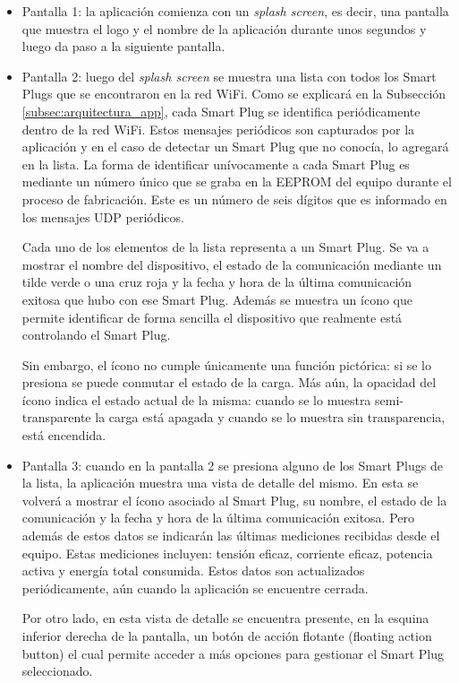 \begin{itemize}
\item  Pantalla 1: la aplicación comienza con un \textit{splash screen}, es decir, una pantalla que muestra el logo y el nombre de la aplicación durante unos segundos y luego da paso a la siguiente pantalla.

\item Pantalla 2: luego del \textit{splash screen} se muestra una lista con todos los Smart Plugs que se encontraron en la red WiFi. Como se explicará en la Subsección \ref{subsec:arquitectura_app}, cada Smart Plug se identifica periódicamente dentro de la red WiFi. Estos mensajes periódicos son capturados por la aplicación y en el caso de detectar un Smart Plug que no conocía, lo agregará en la lista. La forma de identificar unívocamente a cada Smart Plug es mediante un número único que se graba en la EEPROM del equipo durante el proceso de fabricación. Este es un número de seis dígitos que es informado en los mensajes UDP periódicos.

Cada uno de los elementos de la lista representa a un Smart Plug. Se va a mostrar el nombre del dispositivo, el estado de la comunicación mediante un tilde verde o una cruz roja y la fecha y hora de la última comunicación exitosa que hubo con ese Smart Plug. Además se muestra un ícono que permite identificar de forma sencilla el dispositivo que realmente está controlando el Smart Plug. 

Sin embargo, el ícono no cumple únicamente una función pictórica: si se lo presiona se puede conmutar el estado de la carga. Más aún, la opacidad del ícono indica el estado actual de la misma: cuando se lo muestra semi-transparente la carga está apagada y cuando se lo muestra sin transparencia, está encendida.

\item Pantalla 3: cuando en la pantalla 2 se presiona alguno de los Smart Plugs de la lista, la aplicación muestra una vista de detalle del mismo. En esta se volverá a mostrar el ícono asociado al Smart Plug, su nombre, el estado de la comunicación y la fecha y hora de la última comunicación exitosa. Pero además de estos datos se indicarán las últimas mediciones recibidas desde el equipo. Estas mediciones incluyen: tensión eficaz, corriente eficaz, potencia activa y energía total consumida. Estos datos son actualizados periódicamente, aún cuando la aplicación se encuentre cerrada.

Por otro lado, en esta vista de detalle se encuentra presente, en la esquina inferior derecha de la pantalla, un botón de acción flotante (floating action button) el cual permite acceder a más opciones para gestionar el Smart Plug seleccionado.


\end{itemize}
